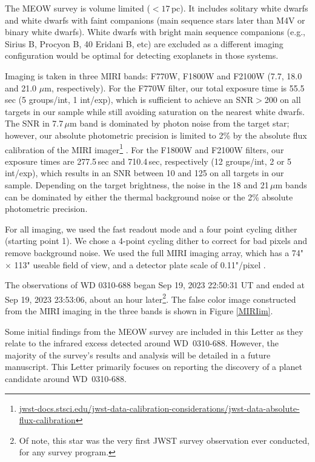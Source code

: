 \documentclass[twocolumn]{aastex631}
\begin{document}
The MEOW survey is volume limited ($<17$\,pc). It includes solitary white dwarfs and white dwarfs with faint companions (main sequence stars later than M4V or binary white dwarfs). White dwarfs with bright main sequence companions (e.g., Sirius B, Procyon B, 40 Eridani B, etc) are excluded as a different imaging configuration would be optimal for detecting exoplanets in those systems. 


Imaging is taken in three MIRI bands: F770W, F1800W and F2100W (7.7, 18.0 and 21.0 $\mu$m, respectively). For the F770W filter, our total exposure time is 55.5\,sec (5 groups/int, 1 int/exp), which is sufficient to achieve an SNR$>$200 on all targets in our sample while still avoiding saturation on the nearest white dwarfs. The SNR in 7.7\,$\mu$m band is dominated by photon noise from the target star; however, our absolute photometric precision is limited to 2\% by the absolute flux calibration of the MIRI imager\footnote{\url{jwst-docs.stsci.edu/jwst-data-calibration-considerations/jwst-data-absolute-flux-calibration}} \citep{2022arXiv220406500G}. For the F1800W and F2100W filters, our exposure times are 277.5\,sec and 710.4\,sec, respectively (12 groups/int, 2 or 5 int/exp), which results in an SNR between 10 and 125 on all targets in our sample. Depending on the target brightness, the noise in the 18 and 21\,$\mu$m bands can be dominated by either the thermal background noise or the 2\% absolute photometric precision. 





For all imaging, we used the fast readout mode and a four point cycling dither (starting point 1). We chose a 4-point cycling dither to correct for bad pixels and remove background noise. We used the full MIRI imaging array, which has a 74" $\times$ 113" useable field of view, and a detector plate scale of 0.11"/pixel \citep{2015PASP..127..612B}. 

The observations of WD 0310-688 began Sep 19, 2023 22:50:31 UT and ended at Sep 19, 2023 23:53:06, about an hour later\footnote{Of note, this star was the very first JWST survey observation ever conducted, for any survey program.}.
The false color image constructed from the MIRI imaging in the three bands is shown in Figure \ref{MIRIim}. 

{Some initial findings from the MEOW survey are included in this Letter as they relate to the infrared excess detected around WD~0310-688. However, the majority of the survey's results and analysis will be detailed in a future manuscript. This Letter primarily focuses on reporting the discovery of a planet candidate around WD~0310-688.}
\end{document}
